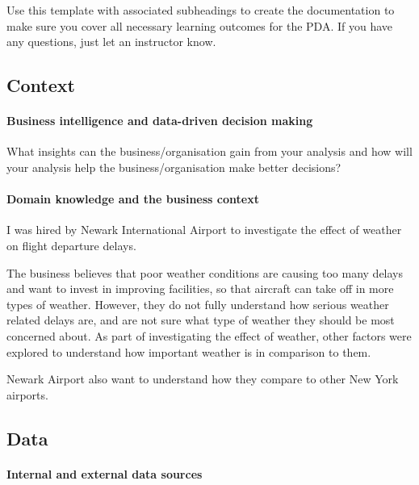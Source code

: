 \documentclass[
]{article}
\begin{document}
Use this template with associated subheadings to create the
documentation to make sure you cover all necessary learning outcomes for
the PDA. If you have any questions, just let an instructor know.

\hypertarget{context}{%
\subsection{Context}\label{context}}

\hypertarget{business-intelligence-and-data-driven-decision-making}{%
\paragraph{Business intelligence and data-driven decision
making}\label{business-intelligence-and-data-driven-decision-making}}

What insights can the business/organisation gain from your analysis and
how will your analysis help the business/organisation make better
decisions?

\hypertarget{domain-knowledge-and-the-business-context}{%
\paragraph{Domain knowledge and the business
context}\label{domain-knowledge-and-the-business-context}}

I was hired by Newark International Airport to investigate the effect of
weather on flight departure delays.

The business believes that poor weather conditions are causing too many
delays and want to invest in improving facilities, so that aircraft can
take off in more types of weather. However, they do not fully understand
how serious weather related delays are, and are not sure what type of
weather they should be most concerned about. As part of investigating
the effect of weather, other factors were explored to understand how
important weather is in comparison to them.

Newark Airport also want to understand how they compare to other New
York airports.

\hypertarget{data}{%
\subsection{Data}\label{data}}

\hypertarget{internal-and-external-data-sources}{%
\paragraph{Internal and external data
sources}\label{internal-and-external-data-sources}}
\end{document}
